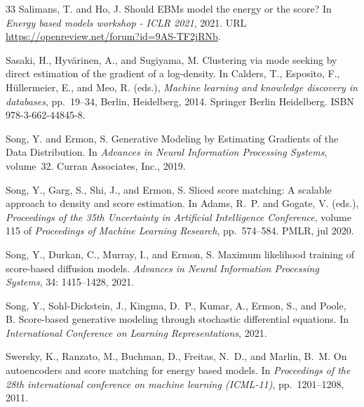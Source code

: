 \documentclass{article} %
\begin{document}
\begin{thebibliography}{33}
Salimans, T. and Ho, J.
\newblock Should {EBMs} model the energy or the score?
\newblock In \emph{Energy based models workshop - {ICLR} 2021}, 2021.
\newblock URL \url{https://openreview.net/forum?id=9AS-TF2jRNb}.

Sasaki, H., Hyvärinen, A., and Sugiyama, M.
\newblock Clustering via mode seeking by direct estimation of the gradient of a log-density.
\newblock In Calders, T., Esposito, F., Hüllermeier, E., and Meo, R. (eds.), \emph{Machine learning and knowledge discovery in databases}, pp.\  19--34, Berlin, Heidelberg, 2014. Springer Berlin Heidelberg.
\newblock ISBN 978-3-662-44845-8.

Song, Y. and Ermon, S.
\newblock Generative {{Modeling}} by {{Estimating Gradients}} of the {{Data Distribution}}.
\newblock In \emph{Advances in {{Neural Information Processing Systems}}}, volume~32. {Curran Associates, Inc.}, 2019.

Song, Y., Garg, S., Shi, J., and Ermon, S.
\newblock Sliced score matching: {{A}} scalable approach to density and score estimation.
\newblock In Adams, R.~P. and Gogate, V. (eds.), \emph{Proceedings of the 35th Uncertainty in Artificial Intelligence Conference}, volume 115 of \emph{Proceedings of Machine Learning Research}, pp.\  574--584. {PMLR}, jul 2020.

Song, Y., Durkan, C., Murray, I., and Ermon, S.
\newblock Maximum likelihood training of score-based diffusion models.
\newblock \emph{Advances in Neural Information Processing Systems}, 34: 1415--1428, 2021{}.

Song, Y., {Sohl-Dickstein}, J., Kingma, D.~P., Kumar, A., Ermon, S., and Poole, B.
\newblock Score-based generative modeling through stochastic differential equations.
\newblock In \emph{International Conference on Learning Representations}, 2021{}.

Swersky, K., Ranzato, M., Buchman, D., Freitas, N.~D., and Marlin, B.~M.
\newblock On autoencoders and score matching for energy based models.
\newblock In \emph{Proceedings of the 28th international conference on machine learning ({ICML}-11)}, pp.\  1201--1208, 2011.


\end{thebibliography}
\end{document}

